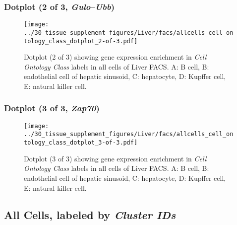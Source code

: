 \clearpage

\subsubsection{Dotplot (2 of 3, \emph{Gulo}--\emph{Ubb})}
\begin{figure}[h]
\centering
\texttt{[image: ../30\_tissue\_supplement\_figures/Liver/facs/allcells\_cell\_ontology\_class\_dotplot\_2-of-3.pdf]}

\caption{ Dotplot (2 of 3)  showing gene expression enrichment in \emph{Cell Ontology Class} labels in all cells of Liver FACS. A: B cell, B: endothelial cell of hepatic sinusoid, C: hepatocyte, D: Kupffer cell, E: natural killer cell.}
\end{figure}


\clearpage

\subsubsection{Dotplot (3 of 3, \emph{Zap70})}
\begin{figure}[h]
\centering
\texttt{[image: ../30\_tissue\_supplement\_figures/Liver/facs/allcells\_cell\_ontology\_class\_dotplot\_3-of-3.pdf]}

\caption{ Dotplot (3 of 3)  showing gene expression enrichment in \emph{Cell Ontology Class} labels in all cells of Liver FACS. A: B cell, B: endothelial cell of hepatic sinusoid, C: hepatocyte, D: Kupffer cell, E: natural killer cell.}
\end{figure}


\clearpage

\subsection{All Cells, labeled by \emph{Cluster IDs}}
